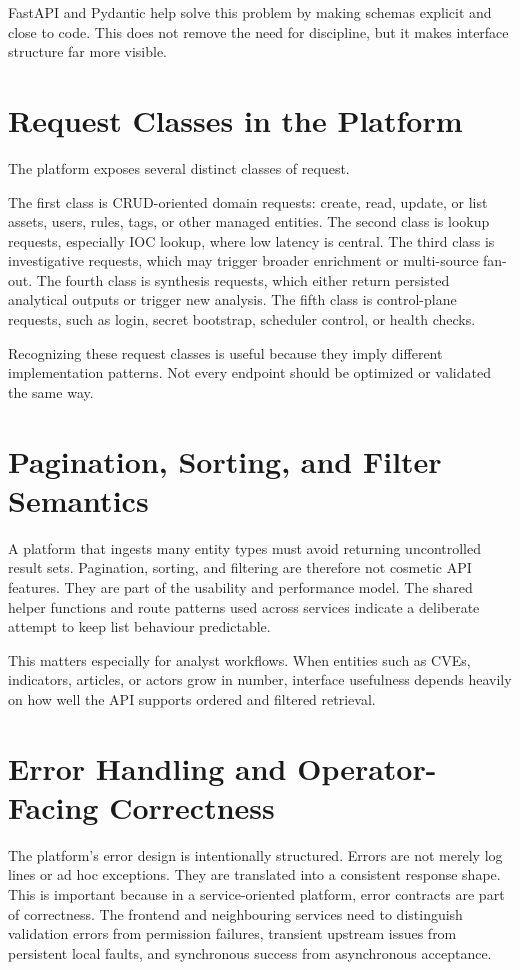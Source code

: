 FastAPI and Pydantic help solve this problem by making schemas explicit and close to code. This does not remove the need for discipline, but it makes interface structure far more visible.

\section{Request Classes in the Platform}
The platform exposes several distinct classes of request.

The first class is CRUD-oriented domain requests: create, read, update, or list assets, users, rules, tags, or other managed entities. The second class is lookup requests, especially IOC lookup, where low latency is central. The third class is investigative requests, which may trigger broader enrichment or multi-source fan-out. The fourth class is synthesis requests, which either return persisted analytical outputs or trigger new analysis. The fifth class is control-plane requests, such as login, secret bootstrap, scheduler control, or health checks.

Recognizing these request classes is useful because they imply different implementation patterns. Not every endpoint should be optimized or validated the same way.

\section{Pagination, Sorting, and Filter Semantics}
A platform that ingests many entity types must avoid returning uncontrolled result sets. Pagination, sorting, and filtering are therefore not cosmetic API features. They are part of the usability and performance model. The shared helper functions and route patterns used across services indicate a deliberate attempt to keep list behaviour predictable.

This matters especially for analyst workflows. When entities such as CVEs, indicators, articles, or actors grow in number, interface usefulness depends heavily on how well the API supports ordered and filtered retrieval.

\section{Error Handling and Operator-Facing Correctness}
The platform's error design is intentionally structured. Errors are not merely log lines or ad hoc exceptions. They are translated into a consistent response shape. This is important because in a service-oriented platform, error contracts are part of correctness. The frontend and neighbouring services need to distinguish validation errors from permission failures, transient upstream issues from persistent local faults, and synchronous success from asynchronous acceptance.

